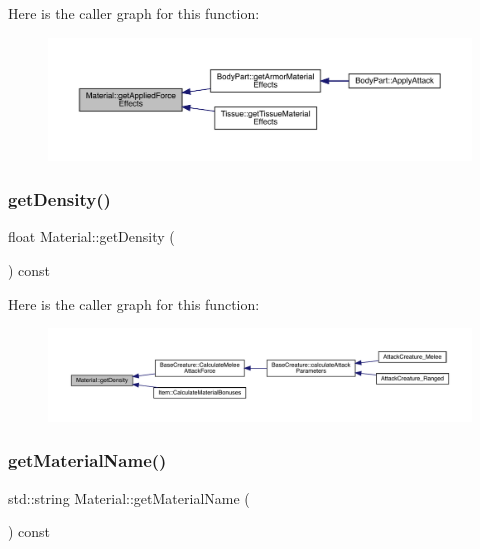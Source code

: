 Here is the caller graph for this function\+:\nopagebreak
\begin{figure}[H]
\begin{center}
\leavevmode
\includegraphics[width=350pt]{dc/dee/class_material_ad443d451fe4f333fa2bd56f11937ebb0_icgraph}
\end{center}
\end{figure}
\mbox{\label{class_material_ac414d481bc0f34f1a55e2d89d9584301}} 
\subsubsection{\texorpdfstring{get\+Density()}{getDensity()}}
{\footnotesize\ttfamily float Material\+::get\+Density (\begin{DoxyParamCaption}{ }\end{DoxyParamCaption}) const}

Here is the caller graph for this function\+:
\nopagebreak
\begin{figure}[H]
\begin{center}
\leavevmode
\includegraphics[width=350pt]{dc/dee/class_material_ac414d481bc0f34f1a55e2d89d9584301_icgraph}
\end{center}
\end{figure}
\mbox{\label{class_material_ac87a8b48812fc2ca84155a1179899635}} 
\subsubsection{\texorpdfstring{get\+Material\+Name()}{getMaterialName()}}
{\footnotesize\ttfamily std\+::string Material\+::get\+Material\+Name (\begin{DoxyParamCaption}{ }\end{DoxyParamCaption}) const}

